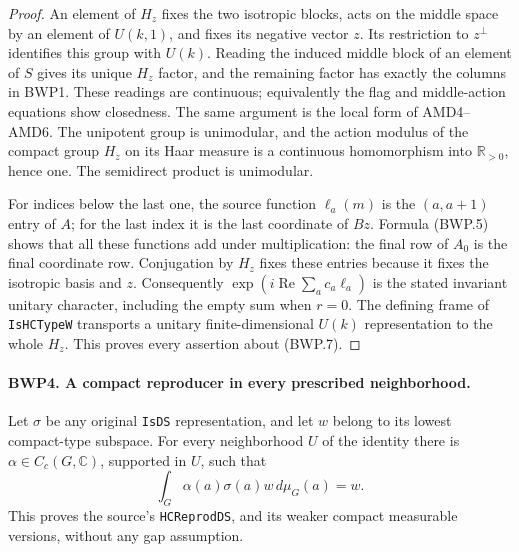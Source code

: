 \documentclass[11pt,a4paper]{article}
\numberwithin{equation}{section}
\theoremstyle{remark}\newtheorem{remark}[theorem]{Remark}
\begin{document}
\begin{proof}
An element of \(H_z\) fixes the two isotropic blocks, acts on the
middle space by an element of \(U(k,1)\), and fixes its negative
vector \(z\).  Its restriction to \(z^\perp\) identifies this
group with \(U(k)\).  Reading the induced middle block of an element
of \(S\) gives its unique \(H_z\) factor, and the remaining
factor has exactly the columns in BWP1.  These readings are continuous;
equivalently the flag and middle-action equations show closedness.
The same argument is the local form of AMD4--AMD6.  The unipotent
group is unimodular, and the action modulus of the compact group
\(H_z\) on its Haar measure is a continuous homomorphism into
\(\mathbb R_{>0}\), hence one.  The semidirect product is unimodular.

For indices below the last one, the source function \(\ell_a(m)\)
is the \((a,a+1)\) entry of \(A\); for the last index it is
the last coordinate of \(Bz\).  Formula (BWP.5) shows that all
these functions add under multiplication: the final row of \(A_0\)
is the final coordinate row.  Conjugation by \(H_z\) fixes these
entries because it fixes the isotropic basis and \(z\).
Consequently \(\exp(i\operatorname{Re}\sum_a c_a\ell_a)\)
is the stated invariant unitary character, including the empty sum
when \(r=0\).  The defining frame of \texttt{Is\allowbreak HCType\allowbreak W}
transports a unitary finite-dimensional \(U(k)\) representation
to the whole \(H_z\).  This proves every assertion about (BWP.7).
\end{proof}

\paragraph{BWP4. A compact reproducer in every prescribed neighborhood.}
\label{claim:BWP4}
Let \(\sigma\) be any original \texttt{Is\allowbreak DS} representation,
and let \(w\) belong to its lowest compact-type subspace.  For
every neighborhood \(U\) of the identity there is
\(\alpha\in C_c(G,\mathbb C)\), supported in \(U\), such that
\[
 \int_G\alpha(a)\sigma(a)w\,d\mu_G(a)=w.
 \tag{BWP.8}
\]
This proves the source's \texttt{HCReprod\allowbreak DS}, and its weaker
compact measurable versions, without any gap assumption.
\end{document}
